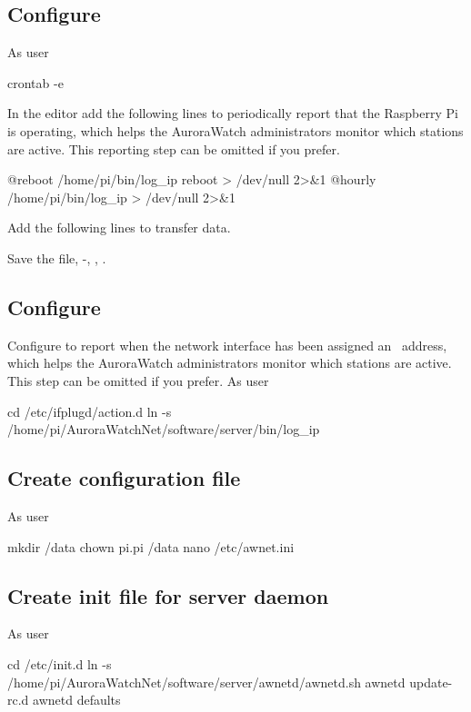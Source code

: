\subsection{Configure \protect{}}
\label{sec:cron-configuration}
As user \piUser
\begin{Cmd}
crontab -e
\end{Cmd}

In the  editor add the following lines to periodically
report that the Raspberry Pi is operating, which helps the AuroraWatch
administrators monitor which stations are active. This reporting step can be
omitted if you prefer.
\begin{Cmd}
@reboot /home/pi/bin/log_ip reboot > /dev/null 2>&1
@hourly /home/pi/bin/log_ip > /dev/null 2>&1
\end{Cmd}


Add the following lines to transfer data. \todo

Save the file, -, ,
\myreturn.

\subsection{Configure \protect{}}

Configure  to report when the network interface has
been assigned an \ip\ address, which helps the AuroraWatch
administrators monitor which stations are active. This step can be
omitted if you prefer. As user \rootUser
\begin{Cmd}
cd /etc/ifplugd/action.d
ln -s /home/pi/AuroraWatchNet/software/server/bin/log_ip
\end{Cmd}

\subsection{Create configuration file}

As user \rootUser
\begin{Cmd}
mkdir /data
chown pi.pi /data
nano /etc/awnet.ini
\end{Cmd}


\subsection{Create init file for server daemon}
As user \rootUser
\begin{Cmd}
cd /etc/init.d
ln -s /home/pi/AuroraWatchNet/software/server/awnetd/awnetd.sh awnetd
update-rc.d  awnetd defaults
\end{Cmd}

